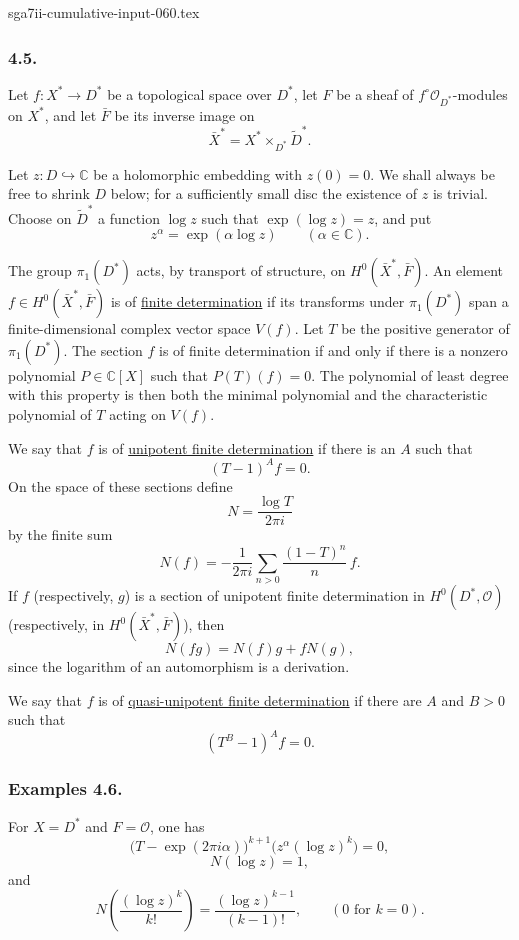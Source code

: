 \begin{filecontents*}{sga7ii-cumulative-input-060.tex}
\subsubsection*{4.5.}
Let $f:X^*\longrightarrow D^*$ be a topological space over $D^*$,
let $F$ be a sheaf of $f^\circ\mathcal O_{D^*}$-modules on $X^*$,
and let $\bar F$ be its inverse image on
\[
\bar X^*=X^*\times_{D^*}\widetilde D^*.
\]

Let $z:D\hookrightarrow\mathbb C$ be a holomorphic embedding with
$z(0)=0$.  We shall always be free to shrink $D$ below; for a
sufficiently small disc the existence of $z$ is trivial.  Choose on
$\widetilde D^*$ a function $\log z$ such that
$\exp(\log z)=z$, and put
\[
z^\alpha=\exp(\alpha\log z)
\qquad(\alpha\in\mathbb C).
\]

The group $\pi_1(D^*)$ acts, by transport of structure, on
$H^0(\bar X^*,\bar F)$.  An element
$f\in H^0(\bar X^*,\bar F)$ is of \underline{finite determination}
if its transforms under $\pi_1(D^*)$ span a finite-dimensional
complex vector space $V(f)$.  Let $T$ be the positive generator of
$\pi_1(D^*)$.  The section $f$ is of finite determination if and only
if there is a nonzero polynomial $P\in\mathbb C[X]$ such that
$P(T)(f)=0$.  The polynomial of least degree with this property is
then both the minimal polynomial and the characteristic polynomial of
$T$ acting on $V(f)$.

We say that $f$ is of \underline{unipotent finite determination} if
there is an $A$ such that
\[
(T-1)^A f=0.
\]
On the space of these sections define
\[
N=\frac{\log T}{2\pi i}
\]
by the finite sum
\[
N(f)=-\frac1{2\pi i}
\sum_{n>0}\frac{(1-T)^n}{n}\,f.
\]
If $f$ (respectively, $g$) is a section of unipotent finite
determination in $H^0(D^*,\mathcal O)$ (respectively, in
$H^0(\bar X^*,\bar F)$), then
\[
N(fg)=N(f)g+fN(g),
\]
since the logarithm of an automorphism is a derivation.

We say that $f$ is of
\underline{quasi-unipotent finite determination} if there are
$A$ and $B>0$ such that
\[
(T^B-1)^A f=0.
\]

\subsubsection*{Examples 4.6.}
For $X=D^*$ and $F=\mathcal O$, one has
\[
\bigl(T-\exp(2\pi i\alpha)\bigr)^{k+1}
  \bigl(z^\alpha(\log z)^k\bigr)=0,
\]
\[
N(\log z)=1,
\]
and
\[
N\left(\frac{(\log z)^k}{k!}\right)
=\frac{(\log z)^{k-1}}{(k-1)!},
\qquad
(0\text{ for }k=0).
\]


\end{filecontents*}

